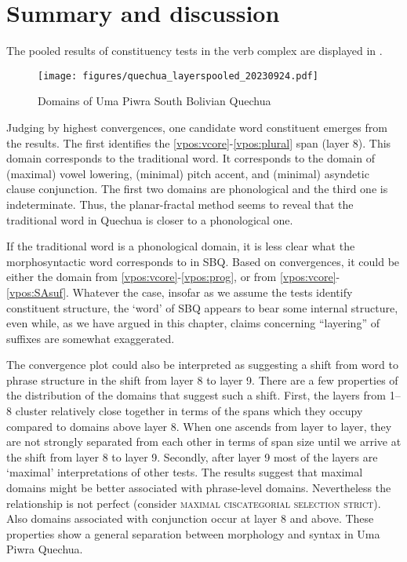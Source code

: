 \documentclass[output=paper]{langscibook}
\begin{document}
\section{Summary and discussion} %
\largerpage[-1]%
\label{sbq:sec:summary}

The pooled results of constituency tests in the verb complex are displayed in .

\begin{figure}
    \centering
    \texttt{[image: figures/quechua\_layerspooled\_20230924.pdf]}
    \caption{Domains of Uma Piwra South Bolivian Quechua}
    \label{fig:sbq.testspooled}
\end{figure}

Judging by highest convergences, one candidate word constituent emerges from the results. The first identifies the \ref{vpos:vcore}-\ref{vpos:plural} span (layer 8). This domain corresponds to the traditional word. It corresponds to the domain of (maximal) vowel lowering, (minimal) pitch accent, and (minimal) asyndetic clause conjunction. The first two domains are phonological and the third one is indeterminate. Thus, the planar-fractal method seems to reveal that the traditional word in Quechua is closer to a phonological one. 

If the traditional word is a phonological domain, it is less clear what the morphosyntactic word corresponds to in SBQ. Based on convergences, it could be either the domain from \ref{vpos:vcore}-\ref{vpos:prog}, or from \ref{vpos:vcore}-\ref{vpos:SAsuf}. Whatever the case, insofar as we assume the tests identify constituent structure, the `word' of SBQ appears to bear some internal structure, even while, as we have argued in this chapter, claims concerning ``layering'' of suffixes are somewhat exaggerated.

The convergence plot could also be interpreted as suggesting a shift from word to phrase structure in the shift from layer 8 to layer 9. There are a few properties of the distribution of the domains that suggest such a shift. First, the layers from 1--8 cluster relatively close together in terms of the spans which they occupy compared to domains above layer 8. When one ascends from layer to layer, they are not strongly separated from each other in terms of span size until we arrive at the shift from layer 8 to layer 9. Secondly, after layer 9 most of the layers are `maximal' interpretations of other tests. The results suggest that maximal domains might be better associated with phrase-level domains. Nevertheless the relationship is not perfect (consider \textsc{maximal ciscategorial selection strict}). Also domains associated with conjunction occur at layer 8 and above. These properties show a general separation between morphology and syntax in Uma Piwra Quechua.
\end{document}
